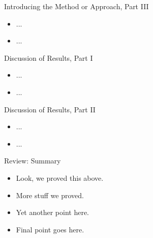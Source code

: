 \documentclass[12pt,t,handout]{beamer}
\begin{document}
\begin{frame}[c]{Introducing the Method or Approach, Part III}

\begin{center}
\begin{itemize}
  \item ...
  \item ...
\end{itemize}
\end{center}


\end{frame}



\begin{frame}[c]{Discussion of Results, Part I}

\begin{center}
\begin{itemize}
  \item ...
  \item ...
\end{itemize}
\end{center}


\end{frame}



\begin{frame}[c]{Discussion of Results, Part II}

\begin{center}
\begin{itemize}
  \item ...
  \item ...
\end{itemize}
\end{center}


\end{frame}



\begin{frame}[c]{Review: Summary}

\begin{center}
\begin{itemize}
  \itemsep12pt
  \item Look, we proved this above.
  \item More stuff we proved.
  \item Yet another point here.
  \item Final point goes here.
\end{itemize}
\end{center}


\end{frame}
\end{document}
